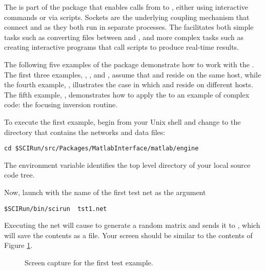 \ModuleRefSummary

The \mlm{} is part of the  package that enables
calls from \sr{} to \m{}, either using interactive commands or via \m{}
scripts.  Sockets are the underlying coupling mechanism that connect \sr{}
and \m{} as they both run in separate processes.  The \mlm{} facilitates
both simple tasks such as converting files between \sr{} and \m{}, and more
complex tasks such as creating interactive \sr{} programs that call \m{}
scripts to produce real-time results.

\ModuleRefUse

The following five examples of the  package
demonstrate how to work with the \mlm{}.  The first three examples,
, , and , assume
that \sr{} and \m{} reside on the same host, while the fourth example,
, illustrates the case in which \sr{} and \m{} reside on
different hosts. The fifth example, , demonstrates how
to apply the \mlm{} to an example of complex \m{} code: the focusing
inversion routine.


To execute the first example, begin from your Unix shell and change to the
directory that contains the networks and data files:
%
\begin{verbatim}
cd $SCIRun/src/Packages/MatlabInterface/matlab/engine
\end{verbatim}
%
The  environment variable identifies the top level
directory of your local \sr{} source code tree.

Now, launch \sr{} with the name of the first test net as the 
argument 
%
\begin{verbatim}
$SCIRun/bin/scirun  tst1.net
\end{verbatim}

Executing the net will cause \m{} to generate a random matrix and sends it
to \sr{}, which will save the contents as a \sr{} file.  Your screen should
be similar to the contents of Figure \ref{fig:tst1}.


\begin{figure}[htb]
  \begin{makeimage}
  \end{makeimage}
  \tstone
  \caption{\label{fig:tst1} Screen capture for the first test
  example.}
\end{figure}


